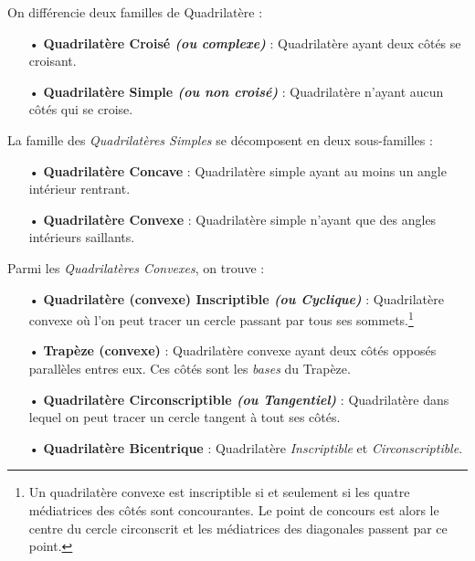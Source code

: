 \documentclass[a4paper, twoside]{article}
\begin{document}
\medbreak

On différencie deux familles de Quadrilatère :

\begin{itemize}
	\item[•] \textbf{Quadrilatère Croisé \textit{(ou complexe)}} : Quadrilatère ayant deux côtés se croisant.
	\item[•] \textbf{Quadrilatère Simple \textit{(ou non croisé)}} : Quadrilatère n'ayant aucun côtés qui se croise.
\end{itemize}

\bigbreak

La famille des \emph{Quadrilatères Simples} se décomposent en deux sous-familles :

\begin{itemize}
	\item[•] \textbf{Quadrilatère Concave} : Quadrilatère simple ayant au moins un angle intérieur rentrant.
	\item[•] \textbf{Quadrilatère Convexe} : Quadrilatère simple n'ayant que des angles intérieurs saillants.
\end{itemize}

\bigbreak

Parmi les \emph{Quadrilatères Convexes}, on trouve :

\begin{itemize}
	\item[•] \textbf{Quadrilatère (convexe) Inscriptible \textit{(ou Cyclique)}} : Quadrilatère convexe où l'on peut tracer un cercle passant par tous ses sommets.\footnote{
		      Un quadrilatère convexe est inscriptible
		      si et seulement si les quatre médiatrices des côtés
		      sont concourantes. Le point de concours est alors le centre
		      du cercle circonscrit et les médiatrices des diagonales
		      passent par ce point.}

	\item[•] \textbf{Trapèze (convexe)} : Quadrilatère convexe ayant deux côtés opposés parallèles entres eux. Ces côtés sont les \emph{bases} du Trapèze.
	\item[•] \textbf{Quadrilatère Circonscriptible \textit{(ou Tangentiel)}} : Quadrilatère dans lequel on peut tracer un cercle tangent à tout ses côtés.
	\item[•] \textbf{Quadrilatère Bicentrique} : Quadrilatère \textit{Inscriptible} et \textit{Circonscriptible}.
\end{itemize}

\bigbreak
\end{document}
